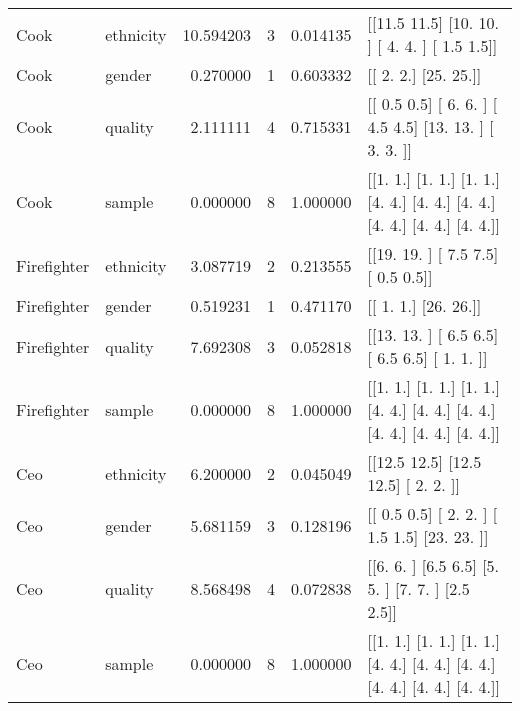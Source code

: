\begin{tabular}{llrrrl}
Cook  & ethnicity & 10.594203 & 3 & 0.014135 & [[11.5 11.5]
 [10.  10. ]
 [ 4.   4. ]
 [ 1.5  1.5]] \\
Cook  & gender & 0.270000 & 1 & 0.603332 & [[ 2.  2.]
 [25. 25.]] \\
Cook  & quality & 2.111111 & 4 & 0.715331 & [[ 0.5  0.5]
 [ 6.   6. ]
 [ 4.5  4.5]
 [13.  13. ]
 [ 3.   3. ]] \\
Cook  & sample & 0.000000 & 8 & 1.000000 & [[1. 1.]
 [1. 1.]
 [1. 1.]
 [4. 4.]
 [4. 4.]
 [4. 4.]
 [4. 4.]
 [4. 4.]
 [4. 4.]] \\
Firefighter  & ethnicity & 3.087719 & 2 & 0.213555 & [[19.  19. ]
 [ 7.5  7.5]
 [ 0.5  0.5]] \\
Firefighter  & gender & 0.519231 & 1 & 0.471170 & [[ 1.  1.]
 [26. 26.]] \\
Firefighter  & quality & 7.692308 & 3 & 0.052818 & [[13.  13. ]
 [ 6.5  6.5]
 [ 6.5  6.5]
 [ 1.   1. ]] \\
Firefighter  & sample & 0.000000 & 8 & 1.000000 & [[1. 1.]
 [1. 1.]
 [1. 1.]
 [4. 4.]
 [4. 4.]
 [4. 4.]
 [4. 4.]
 [4. 4.]
 [4. 4.]] \\
Ceo  & ethnicity & 6.200000 & 2 & 0.045049 & [[12.5 12.5]
 [12.5 12.5]
 [ 2.   2. ]] \\
Ceo  & gender & 5.681159 & 3 & 0.128196 & [[ 0.5  0.5]
 [ 2.   2. ]
 [ 1.5  1.5]
 [23.  23. ]] \\
Ceo  & quality & 8.568498 & 4 & 0.072838 & [[6.  6. ]
 [6.5 6.5]
 [5.  5. ]
 [7.  7. ]
 [2.5 2.5]] \\
Ceo  & sample & 0.000000 & 8 & 1.000000 & [[1. 1.]
 [1. 1.]
 [1. 1.]
 [4. 4.]
 [4. 4.]
 [4. 4.]
 [4. 4.]
 [4. 4.]
 [4. 4.]] \\
\bottomrule
\end{tabular}

